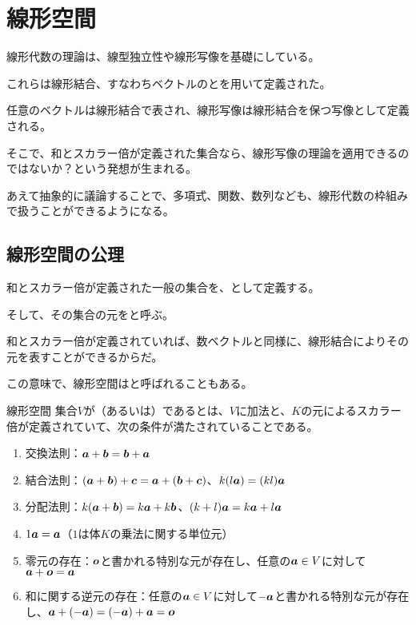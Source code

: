 \documentclass[../../../topic_linear-algebra]{subfiles}
\begin{document}
\sectionline
\section{線形空間}

線形代数の理論は、線型独立性や線形写像を基礎にしている。

\br

これらは線形結合、すなわちベクトルのとを用いて定義された。

任意のベクトルは線形結合で表され、線形写像は線形結合を保つ写像として定義される。

\br

そこで、和とスカラー倍が定義された集合なら、線形写像の理論を適用できるのではないか？という発想が生まれる。

あえて抽象的に議論することで、多項式、関数、数列なども、線形代数の枠組みで扱うことができるようになる。

\subsection{線形空間の公理}

和とスカラー倍が定義された一般の集合を、として定義する。

\br

そして、その集合の元をと呼ぶ。

和とスカラー倍が定義されていれば、数ベクトルと同様に、線形結合によりその元を表すことができるからだ。

この意味で、線形空間はと呼ばれることもある。

\begin{definition*}{線形空間}
  集合$V$が（あるいは）であるとは、$V$に加法と、$K$の元によるスカラー倍が定義されていて、次の条件が満たされていることである。
  \begin{enumerate}[label=\romanlabel]
    \item 交換法則：$\vb*{a} + \vb*{b} = \vb*{b} + \vb*{a}$
    \item 結合法則：$(\vb*{a} + \vb*{b}) + \vb*{c} = \vb*{a} + (\vb*{b} + \vb*{c})$、$k(l\vb*{a}) = (kl)\vb*{a}$
    \item 分配法則：$k(\vb*{a} + \vb*{b}) = k\vb*{a} + k\vb*{b}$、$(k + l)\vb*{a} = k\vb*{a} + l\vb*{a}$
    \item $1 \vb*{a} = \vb*{a}$（$1$は体$K$の乗法に関する単位元）
    \item 零元の存在：$\vb*{o}$と書かれる特別な元が存在し、任意の$\vb*{a} \in V$に対して$\vb*{a} + \vb*{o} = \vb*{a}$
    \item 和に関する逆元の存在：任意の$\vb*{a} \in V$に対して$-\vb*{a}$と書かれる特別な元が存在し、$\vb*{a} + (-\vb*{a}) = (-\vb*{a}) + \vb*{a} = \vb*{o}$
  \end{enumerate}
\end{definition*}
\end{document}
